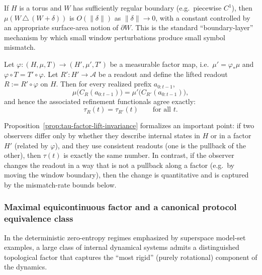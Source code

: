 \begin{remark}
If $H$ is a torus and $W$ has sufficiently regular boundary (e.g.\ piecewise $C^1$), then $\mu(W\,\triangle\,(W+\delta))$ is $O(\|\delta\|)$ as $\|\delta\|\to 0$, with a constant controlled by an appropriate surface-area notion of $\partial W$. This is the standard ``boundary-layer'' mechanism by which small window perturbations produce small symbol mismatch.\cite{KuipersNiederreiter1974,BaakeGrimm2013}
\end{remark}

\begin{proposition}\label{prop:tau-factor-lift-invariance}
Let $\varphi:(H,\mu,T)\to (H',\mu',T')$ be a measurable factor map, i.e.\ $\mu'=\varphi_\ast\mu$ and $\varphi\circ T=T'\circ\varphi$. Let $R':H'\to\mathcal{A}$ be a readout and define the lifted readout $R:=R'\circ\varphi$ on $H$. Then for every realized prefix $a_{0:t-1}$,
\[
\mu\bigl(C_R(a_{0:t-1})\bigr)=\mu'\bigl(C_{R'}(a_{0:t-1})\bigr),
\]
and hence the associated refinement functionals agree exactly:
\[
\tau_R(t)=\tau_{R'}(t)\qquad \text{for all }t.
\]
\end{proposition}

\begin{remark}
Proposition~\ref{prop:tau-factor-lift-invariance} formalizes an important point: if two observers differ only by whether they describe internal states in $H$ or in a factor $H'$ (related by $\varphi$), and they use consistent readouts (one is the pullback of the other), then $\tau(t)$ is exactly the same number. In contrast, if the observer changes the readout in a way that is not a pullback along a factor (e.g.\ by moving the window boundary), then the change is quantitative and is captured by the mismatch-rate bounds below.
\end{remark}

\subsubsection{Maximal equicontinuous factor and a canonical protocol equivalence class}\label{sec:info-time:mef}

In the deterministic zero-entropy regimes emphasized by superspace model-set examples, a large class of internal dynamical systems admits a distinguished topological factor that captures the ``most rigid'' (purely rotational) component of the dynamics.

